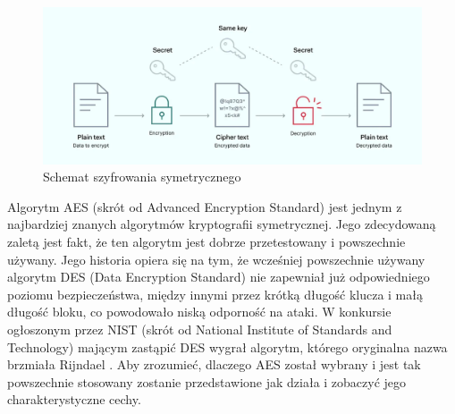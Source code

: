 \begin{figure}[hb]
    \centering
    \includegraphics[width=\textwidth]{Images/AES1.png}
    \caption{Schemat szyfrowania symetrycznego}
    \label{fig:AES1}
\end{figure}
\clearpage
Algorytm AES (skrót od Advanced Encryption Standard) jest jednym z najbardziej znanych algorytmów kryptografii symetrycznej. Jego zdecydowaną zaletą jest fakt, że ten algorytm jest dobrze przetestowany i powszechnie używany. Jego historia opiera się na tym, że wcześniej powszechnie używany algorytm DES (Data Encryption Standard) nie zapewniał już odpowiedniego poziomu bezpieczeństwa, między innymi przez krótką długość klucza i małą długość bloku, co powodowało niską odporność na ataki. W konkursie ogłoszonym przez NIST (skrót od National Institute of Standards and Technology) mającym zastąpić DES wygrał algorytm, którego oryginalna nazwa brzmiała Rijndael \cite{AESSANS}. Aby zrozumieć, dlaczego AES został wybrany i jest tak powszechnie stosowany zostanie przedstawione jak działa i zobaczyć jego charakterystyczne cechy.


